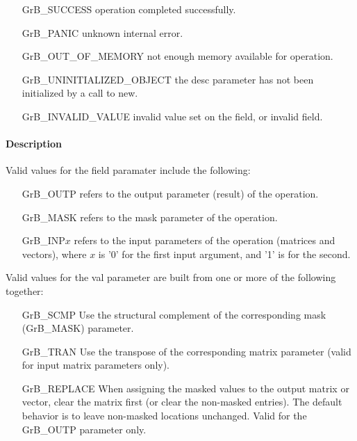\begin{itemize}[leftmargin=2.1in]
\item[{\sf GrB\_SUCCESS}]           operation completed successfully.
\item[{\sf GrB\_PANIC}]             unknown internal error.
\item[{\sf GrB\_OUT\_OF\_MEMORY}]          not enough memory available for operation.
\item[{\sf GrB\_UNINITIALIZED\_OBJECT}]          the {\sf desc} parameter has not been
                                    initialized by a call to {\sf new}.
\item[{\sf GrB\_INVALID\_VALUE}]    invalid value set on the field, or invalid field.
\end{itemize}

\paragraph{Description}

Valid values for the {\sf field} paramater include the following:

\begin{itemize}[leftmargin=1.5in]
\item[{\sf GrB\_OUTP}]   refers to the output parameter (result) of the operation.
\item[{\sf GrB\_MASK}]   refers to the mask parameter of the operation.
\item[{\sf GrB\_INP}$x$] refers to the input parameters of the operation 
                         (matrices and vectors), where $x$ is '0' for the first input argument, and '1' is for the second.
\end{itemize}

Valid values for the {\sf val} parameter are built from one or
more of the following together:

\begin{itemize}[leftmargin=1.5in]
\item[{\sf GrB\_SCMP}]    Use the structural complement of the corresponding mask
                          (GrB\_MASK) parameter.
\item[{\sf GrB\_TRAN}]    Use the transpose of the corresponding matrix parameter
                          (valid for input matrix parameters only).
\item[{\sf GrB\_REPLACE}] When assigning the masked values to the output matrix
                          or vector, clear the matrix first (or clear the
                          non-masked entries).  The default behavior is to leave
                          non-masked locations unchanged.  Valid for the
                          {\sf GrB\_OUTP} parameter only.
\end{itemize}

 



